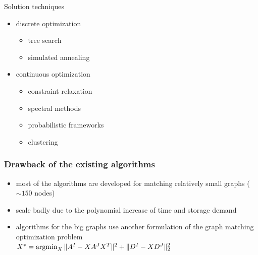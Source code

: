 \documentclass[hyperref={pdfpagelabels=false}]{beamer}
\def\argmin{\mathop{\rm argmin}}						%
\begin{document}
\begin{frame} [allowframebreaks]
Solution techniques~{\tiny\citep{Conte2004}}
\begin{itemize}
\item discrete optimization
	\begin{itemize}
	\item tree search~{\tiny\citep{Bunke1983_inexactGM,Shapiro1981,Fu1979,Wang1995}}
	\item simulated annealing~{\tiny\citep{Herault1990_SimulatedAnnealing}}
	\end{itemize} 
\item continuous optimization
	\begin{itemize}
		\item constraint relaxation~{\tiny\citep{Rangarajan1996_GAGM,Leordeanu2009_IPFP,FastPFP,Vogelstein_BrainGraphs,Zazlavskiy2008_PATH}}
		\item spectral methods~{\tiny\citep{Leordeanu2005_SM,Umeyam1988}}
		\item probabilistic frameworks~{\tiny\citep{Armiti2014,Hancock_Kittler,Hancock_EM_SVD,Sanrom2012}}
		\item clustering~{\tiny\citep{Hancock_ModalClusters,Cho2009_AgglClustering,Hancock_GM_SpectralPart,Lyzinski2015}}
	\end{itemize} 
\end{itemize}
\end{frame}
\begin{frame}
\frametitle{Drawback of the existing algorithms}

\begin{itemize}
\item most of the algorithms are developed for matching relatively small graphs ($\sim 150$ nodes)
\item scale badly due to the polynomial increase of time and storage demand
\item algorithms for the big graphs use another formulation of the graph matching optimization problem\\
\vspace{5pt}
{\centering
$X^* = \argmin_{X}\|A^I-XA^JX^T\|^2+\|D^I-XD^J\|^2_2$}
\end{itemize}

\end{frame}
\end{document}
